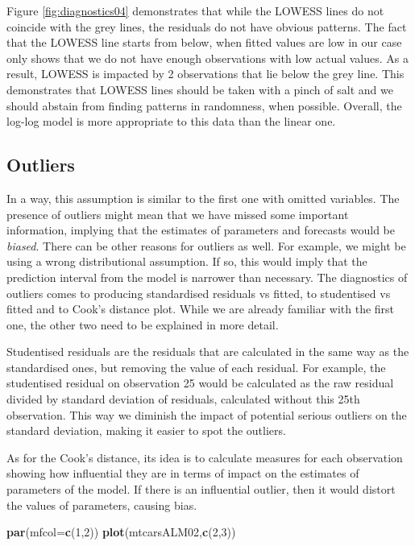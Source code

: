 \documentclass[
]{book}
\newenvironment{Shaded}{\begin{snugshade}}{\end{snugshade}}
\newcommand{\AttributeTok}[1]{\textcolor[rgb]{0.13,0.29,0.53}{#1}}
\newcommand{\DecValTok}[1]{\textcolor[rgb]{0.00,0.00,0.81}{#1}}
\newcommand{\FunctionTok}[1]{\textcolor[rgb]{0.13,0.29,0.53}{\textbf{#1}}}
\newcommand{\NormalTok}[1]{#1}
\theoremstyle{definition}
\theoremstyle{definition}
\theoremstyle{definition}
\theoremstyle{definition}
\theoremstyle{remark}
\begin{document}
Figure \ref{fig:diagnostics04} demonstrates that while the LOWESS lines do not coincide with the grey lines, the residuals do not have obvious patterns. The fact that the LOWESS line starts from below, when fitted values are low in our case only shows that we do not have enough observations with low actual values. As a result, LOWESS is impacted by 2 observations that lie below the grey line. This demonstrates that LOWESS lines should be taken with a pinch of salt and we should abstain from finding patterns in randomness, when possible. Overall, the log-log model is more appropriate to this data than the linear one.

\subsection{Outliers}\label{assumptionsCorrectModelOutliers}

In a way, this assumption is similar to the first one with omitted variables. The presence of outliers might mean that we have missed some important information, implying that the estimates of parameters and forecasts would be \emph{biased}. There can be other reasons for outliers as well. For example, we might be using a wrong distributional assumption. If so, this would imply that the prediction interval from the model is narrower than necessary. The diagnostics of outliers comes to producing standardised residuals vs fitted, to studentised vs fitted and to Cook's distance plot. While we are already familiar with the first one, the other two need to be explained in more detail.

Studentised residuals are the residuals that are calculated in the same way as the standardised ones, but removing the value of each residual. For example, the studentised residual on observation 25 would be calculated as the raw residual divided by standard deviation of residuals, calculated without this 25th observation. This way we diminish the impact of potential serious outliers on the standard deviation, making it easier to spot the outliers.

As for the Cook's distance, its idea is to calculate measures for each observation showing how influential they are in terms of impact on the estimates of parameters of the model. If there is an influential outlier, then it would distort the values of parameters, causing bias.

\begin{Shaded}
\begin{Highlighting}[]
\FunctionTok{par}\NormalTok{(}\AttributeTok{mfcol=}\FunctionTok{c}\NormalTok{(}\DecValTok{1}\NormalTok{,}\DecValTok{2}\NormalTok{))}
\FunctionTok{plot}\NormalTok{(mtcarsALM02,}\FunctionTok{c}\NormalTok{(}\DecValTok{2}\NormalTok{,}\DecValTok{3}\NormalTok{))}
\end{Highlighting}
\end{Shaded}
\end{document}
